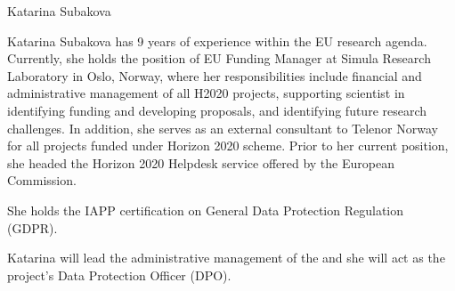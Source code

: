 \begin{participant}[type=PM,PM=24,gender=female]{Katarina Subakova}


Katarina Subakova has 9 years of experience within the EU research agenda. Currently, she holds the position of EU Funding Manager at Simula Research Laboratory in Oslo, Norway, where her responsibilities include financial and administrative management of all H2020 projects, supporting scientist in identifying funding and developing proposals, and identifying future research challenges. In addition, she serves as an external consultant to Telenor Norway for all projects funded under Horizon 2020 scheme. Prior to her current position, she headed the Horizon 2020 Helpdesk service offered by the European Commission. 

She holds the IAPP certification on General Data Protection Regulation (GDPR). 

Katarina will lead the administrative management of the \TheProject and she will act as the project's Data Protection Officer (DPO).

\end{participant}

